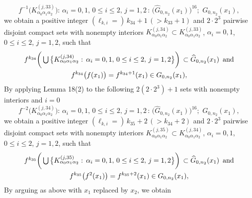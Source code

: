 \documentclass[12pt]{article}
\newcommand{\al}{\alpha}
\begin{document}
$$
f^{-1}\big(K_{\al_0\al_1\al_2}^{(j,33)}\big): \, \al_i = 0, 1, \, 0 \le i \le 2, \, j = 1, 2 \, : \, \big(\widehat G_{0,n_2}(x_1)\big)^{16}; \,\, G_{0,n_2}(x_1),
$$
we obtain a positive integer $(\ell_{k,i} = ) \, k_{34}+1 \, (> k_{33}+1)$ and $2 \cdot 2^3$ pairwise disjoint compact sets with nonempty interiors $K_{\al_0\al_1\al_2}^{(j,34)} \subset K_{\al_0\al_1\al_2}^{(j,33)}$, $\al_i = 0, 1$, $0 \le i \le 2$, $j = 1, 2$, such that 
\begin{multline*}
$$
f^{k_{34}}\bigg(\bigcup \big\{ K_{\al_0\al_1\al_2}^{(j,34)}: \, \al_i = 0, 1, \, 0 \le i \le 2, \, j = 1, 2 \big\}\bigg) \, \subset \widehat G_{0,n_2}(x_1) \,\,\, \text{and} \\
f^{k_{34}}\big(f(x_1)\big) = f^{k_{34}+1}(x_1) \in G_{0,n_2}(x_1),
$$
\end{multline*}
\indent By applying Lemma 18(2) to the following $2(2 \cdot 2^3)+1$ sets with nonempty interiors and $i = 0$
$$
f^{-2}\big(K_{\al_0\al_1\al_2}^{(j,34)}\big): \, \al_i = 0, 1, \, 0 \le i \le 2, \, j = 1, 2 \, : \, \big(\widehat G_{0,n_2}(x_1)\big)^{16}; \,\, G_{0,n_2}(x_1),
$$
we obtain a positive integer $(\ell_{k,i} = ) \, k_{35}+2 \, (> k_{34}+2)$ and $2 \cdot 2^3$ pairwise disjoint compact sets with nonempty interiors $K_{\al_0\al_1\al_2}^{(j,35)} \subset K_{\al_0\al_1\al_2}^{(j,34)}$, $\al_i = 0, 1$, $0 \le i \le 2$, $j = 1, 2$, such that 
\begin{multline*}
$$
f^{k_{35}}\bigg(\bigcup \big\{ K_{\al_0\al_1\al_2}^{(j,35)}: \, \al_i = 0, 1, \, 0 \le i \le 2, \, j = 1, 2 \big\}\bigg) \, \subset \widehat G_{0,n_2}(x_1) \,\,\, \text{and} \\
f^{k_{35}}\big(f^2(x_1)\big) = f^{k_{35}+2}(x_1) \in G_{0,n_2}(x_1),
$$
\end{multline*}
\indent By arguing as above with $x_1$ replaced by $x_2$, we obtain
\end{document}
